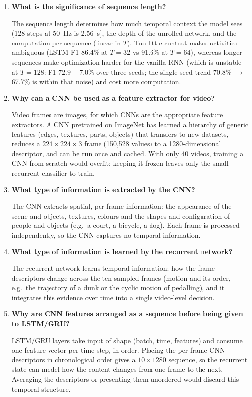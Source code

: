 \documentclass[10pt]{article}
\begin{document}
\begin{enumerate}[itemsep=6pt,topsep=3pt]
\item \textbf{What is the significance of sequence length?}\par\smallskip
The sequence length determines how much temporal context the model sees (128 steps at 50~Hz is 2.56~s), the depth of the unrolled network, and the computation per sequence (linear in $T$). Too little context makes activities ambiguous (LSTM F1 86.4\% at $T{=}32$ vs 91.6\% at $T{=}64$), whereas longer sequences make optimization harder for the vanilla RNN (which is unstable at $T{=}128$: F1 $72.9\pm7.0$\% over three seeds; the single-seed trend 70.8\% $\to$ 67.7\% is within that noise) and cost more computation.

\item \textbf{Why can a CNN be used as a feature extractor for video?}\par\smallskip
Video frames are images, for which CNNs are the appropriate feature extractors. A CNN pretrained on ImageNet has learned a hierarchy of generic features (edges, textures, parts, objects) that transfers to new datasets, reduces a $224\times224\times3$ frame (150,528 values) to a 1280-dimensional descriptor, and can be run once and cached. With only 40 videos, training a CNN from scratch would overfit; keeping it frozen leaves only the small recurrent classifier to train.

\item \textbf{What type of information is extracted by the CNN?}\par\smallskip
The CNN extracts spatial, per-frame information: the appearance of the scene and objects, textures, colours and the shapes and configuration of people and objects (e.g.\ a court, a bicycle, a dog). Each frame is processed independently, so the CNN captures no temporal information.

\item \textbf{What type of information is learned by the recurrent network?}\par\smallskip
The recurrent network learns temporal information: how the frame descriptors change across the ten sampled frames (motion and its order, e.g.\ the trajectory of a dunk or the cyclic motion of pedalling), and it integrates this evidence over time into a single video-level decision.

\item \textbf{Why are CNN features arranged as a sequence before being given to LSTM/GRU?}\par\smallskip
LSTM/GRU layers take input of shape (batch, time, features) and consume one feature vector per time step, in order. Placing the per-frame CNN descriptors in chronological order gives a $10\times1280$ sequence, so the recurrent state can model how the content changes from one frame to the next. Averaging the descriptors or presenting them unordered would discard this temporal structure.


\end{enumerate}
\end{document}
